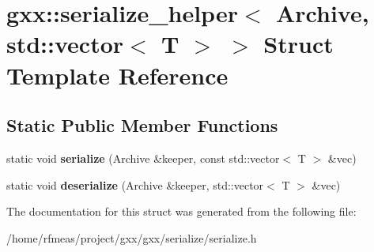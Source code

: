 \hypertarget{structgxx_1_1serialize__helper_3_01Archive_00_01std_1_1vector_3_01T_01_4_01_4}{}\section{gxx\+:\+:serialize\+\_\+helper$<$ Archive, std\+:\+:vector$<$ T $>$ $>$ Struct Template Reference}
\label{structgxx_1_1serialize__helper_3_01Archive_00_01std_1_1vector_3_01T_01_4_01_4}
\subsection*{Static Public Member Functions}
\begin{DoxyCompactItemize}
\item 
static void {\bfseries serialize} (Archive \&keeper, const std\+::vector$<$ T $>$ \&vec)\hypertarget{structgxx_1_1serialize__helper_3_01Archive_00_01std_1_1vector_3_01T_01_4_01_4_adc230bb2311f837de30d9691046a5227}{}\label{structgxx_1_1serialize__helper_3_01Archive_00_01std_1_1vector_3_01T_01_4_01_4_adc230bb2311f837de30d9691046a5227}

\item 
static void {\bfseries deserialize} (Archive \&keeper, std\+::vector$<$ T $>$ \&vec)\hypertarget{structgxx_1_1serialize__helper_3_01Archive_00_01std_1_1vector_3_01T_01_4_01_4_ac3cb0fcb31bfbeb20efa115f1a763240}{}\label{structgxx_1_1serialize__helper_3_01Archive_00_01std_1_1vector_3_01T_01_4_01_4_ac3cb0fcb31bfbeb20efa115f1a763240}

\end{DoxyCompactItemize}


The documentation for this struct was generated from the following file\+:\begin{DoxyCompactItemize}
\item 
/home/rfmeas/project/gxx/gxx/serialize/serialize.\+h\end{DoxyCompactItemize}
